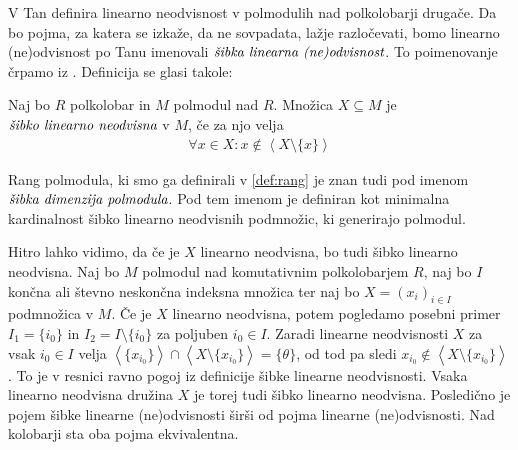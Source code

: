 \documentclass[mat1]{fmfdelo}
\newcommand{\pojem}[1]{\ensuremath{\emph{#1}}}
\newcommand{\Gen}[1]{\ensuremath{\left<{#1}\right>}}
\begin{document}
V \cite[definicija 2.\,3.\,]{bib:Tanbase} Tan definira linearno neodvisnost v polmodulih nad polkolobarji drugače. Da bo pojma, za katera se izkaže, da ne sovpadata, lažje razločevati, bomo linearno (ne)odvisnost po Tanu imenovali \pojem{šibka linearna (ne)odvisnost}. To poimenovanje črpamo iz \cite[definicija 2. 12.]{bib:AkianTropSemi}. Definicija se glasi takole:
\begin{definicija}\label{def:linneodv2}
	Naj bo $R$ polkolobar in $M$ polmodul nad $R$. Množica $X\subseteq M$ je \pojem{šibko linearno neodvisna} v $M$, če za njo velja
\begin{align*}
	\forall x\in X: x \notin \Gen{X\setminus\{x\}}
\end{align*}
\end{definicija}
\begin{opomba}
	 Rang polmodula, ki smo ga definirali v \ref{def:rang} je znan tudi pod imenom \pojem{šibka dimenzija polmodula}. Pod tem imenom je definiran kot minimalna kardinalnost šibko linearno neodvisnih podmnožic, ki generirajo polmodul.
\end{opomba}
Hitro lahko vidimo, da če je $X$ linearno neodvisna, bo tudi šibko linearno neodvisna. Naj bo $M$ polmodul nad komutativnim polkolobarjem $R$, naj bo $I$ končna ali števno neskončna indeksna množica ter naj bo $X = (x_i)_{i\in I}$ podmnožica v $M$. 
Če je $X$ linearno neodvisna, potem pogledamo posebni primer $I_1 = \{i_0\}$ in $I_2 = I\setminus\{i_0\}$ za poljuben $i_0\in I$. Zaradi linearne neodvisnosti $X$ za vsak $i_0 \in I$ velja $\Gen{\{x_{i_0}\}}\cap \Gen{X\setminus\{x_{i_0}\}} = \{\theta\}$, od tod pa sledi $x_{i_0}\notin \Gen{X\setminus\{x_{i_0}\}}$. To je v resnici ravno pogoj iz definicije šibke linearne neodvisnosti. Vsaka linearno neodvisna družina $X$ je torej tudi šibko linearno neodvisna. Posledično je pojem šibke linearne (ne)odvisnosti širši od pojma linearne (ne)odvisnosti. Nad kolobarji sta oba pojma ekvivalentna.
\end{document}
